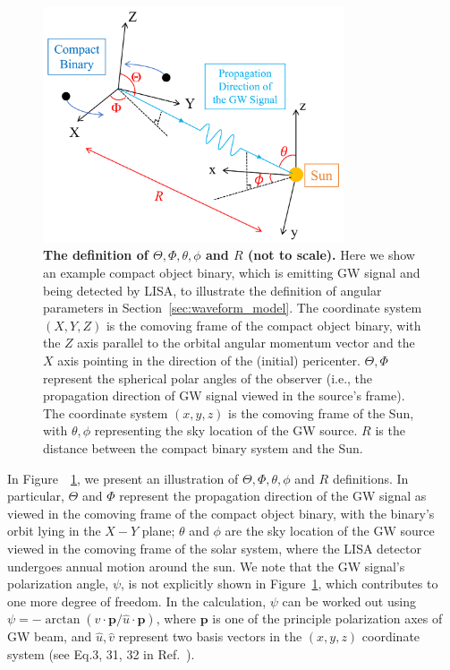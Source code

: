 \documentclass[%
 reprint,
 amsmath,amssymb,
 aps,
]{revtex4-2}
\begin{document}
\begin{figure}[htbp]
    \centering
    \includegraphics[width=3.5in]{coordinate.png} 
    \caption{{\bf The definition of $\Theta,\Phi,\theta,\phi$ and $R$ (not to scale).} Here we show an example compact object binary, which is emitting GW signal and being detected by LISA, to illustrate the definition of angular parameters in Section~\ref{sec:waveform_model}. The coordinate system $(X,Y,Z)$ is the comoving frame of the compact object binary, with the $Z$ axis parallel to the orbital angular momentum vector and the $X$ axis pointing in the direction of the (initial) pericenter. $\Theta,\Phi$ represent the spherical polar angles of the observer  (i.e., the propagation direction of GW signal viewed in the source’s frame). The
    coordinate system $(x,y,z)$ is the comoving frame of the Sun, with $\theta,\phi$ representing the sky location of the GW source. $R$ is the distance between the compact binary system and the Sun.
    }
    \label{fig:coordinate}
\end{figure}

In Figure~~\ref{fig:coordinate}, we present an illustration of $\Theta,\Phi,\theta,\phi$ and $R$ definitions. In particular, $\Theta$ and $\Phi$ represent the propagation direction of the GW signal as viewed in the comoving frame of the compact object binary, with the binary's orbit lying in the $X-Y$ plane; $\theta$ and $\phi$ are the sky location of the GW source viewed in the comoving frame of the solar system, where the LISA detector undergoes annual motion around the sun. We note that the GW signal's polarization angle, $\psi$, is not explicitly shown in Figure~\ref{fig:coordinate}, which contributes to one more degree of freedom. In the calculation, $\psi$ can be worked out using $\psi=-\arctan (\hat{v} \cdot \mathbf{p} / \hat{u} \cdot \mathbf{p})$, where $\mathbf{p}$ is one of the principle polarization axes of GW beam, and $\hat{u}, \hat{v}$ represent two basis vectors in the $(x,y,z)$ coordinate system (see Eq.3, 31, 32 in Ref.~\citep{Cornish+03}). 
\end{document}
